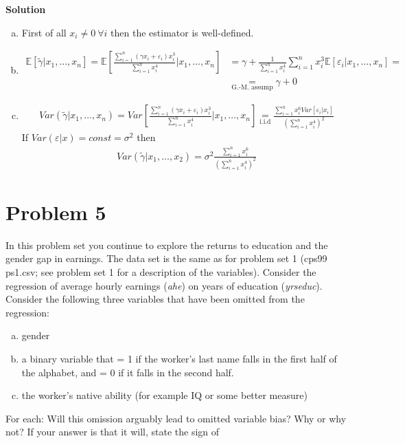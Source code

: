 \documentclass[a4paper]{article}
\newcommand{\expect}{\mathbb{E}}
\newcommand{\summa}{\sum_{i=1}^n}
\begin{document}
\textbf{Solution}


\begin{enumerate}[(a)]
	\item First of all $x_i \neq 0\ \forall i$ then the estimator is well-defined.
	\item \begin{align*}
	\expect[\tilde{\gamma}|x_1, \dots, x_n] = \expect\left[\frac{\summa (\gamma x_i + \varepsilon_i)x_i^3}{\summa x_i^4}\bigg|x_1, \dots, x_n\right] &= \gamma + \frac{1}{\summa x_i^4} \summa x_i^3\expect[\varepsilon_i|x_1, \dots, x_n] =\\
	 &\underset{\text{G.-M. assump}}{=} \gamma + 0
	\end{align*}
	\item \begin{align*}
	Var(\tilde{\gamma}|x_1, \dots, x_n) = Var\left[\frac{\summa (\gamma x_i + \varepsilon_i)x_i^3}{\summa x_i^4}\bigg|x_1, \dots, x_n\right] \underset{\text{i.i.d}}{=} \frac{\summa x_i^6 Var[\varepsilon_i|x_i]}{\left(\summa x_i^4\right)^2} 
	\end{align*}
	If $Var(\varepsilon|x) = const = \sigma^2$ then
	\begin{align*}
	Var(\tilde{\gamma}|x_1, \dots, x_2) = \sigma^2 \frac{\summa x_i^6}{\left(\summa x_i^4\right)^2} 
	\end{align*}
\end{enumerate}
\section*{Problem 5}
In this problem set you continue to explore the returns to education and the gender gap
in earnings. The data set is the same as for problem set 1 (cps99 ps1.csv; see problem set 1
for a description of the variables). Consider the regression of average hourly earnings (\textit{ahe}) on
years of education (\textit{yrseduc}). Consider the following three variables that have been omitted
from the regression:
\begin{enumerate}[(a)]
\item gender
\item a binary variable that = 1 if the worker’s last name falls in the first half of the alphabet,
and = 0 if it falls in the second half.
\item the worker’s native ability (for example IQ or some better measure)
\end{enumerate}
For each: Will this omission arguably lead to omitted variable bias? Why or why not?
If your answer is that it will, state the sign of
\end{document}
